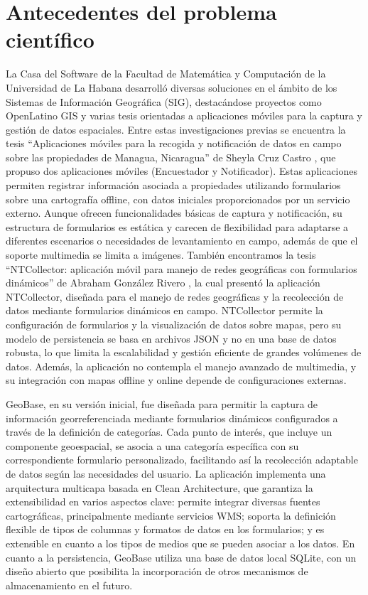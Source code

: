 \documentclass[12pt, a4paper]{book}
\begin{document}
\section{Antecedentes del problema
científico}\label{antecedentes-del-problema-cientuxedfico}
La Casa del Software de la Facultad de Matemática y Computación de la Universidad de La Habana desarrolló diversas soluciones en el ámbito de los Sistemas de Información Geográfica (SIG), destacándose proyectos como OpenLatino GIS y varias tesis orientadas a aplicaciones móviles para la captura y gestión de datos espaciales. Entre estas investigaciones previas se encuentra la tesis ``Aplicaciones móviles  para la recogida y notificación de datos en campo sobre las propiedades de Managua, Nicaragua'' de Sheyla Cruz Castro \cite{castro2018}, que propuso dos aplicaciones móviles (Encuestador y Notificador). Estas aplicaciones permiten registrar información asociada a propiedades utilizando formularios sobre una cartografía offline, con datos iniciales proporcionados por un servicio externo. Aunque ofrecen funcionalidades básicas de captura y notificación, su estructura de formularios es estática y carecen de flexibilidad para adaptarse a diferentes escenarios o necesidades de levantamiento en campo, además de que el soporte multimedia se limita a imágenes. También encontramos la tesis ``NTCollector: aplicación móvil para manejo de redes geográficas con formularios dinámicos'' de Abraham González Rivero \cite{rivero2019}, la cual presentó la aplicación NTCollector, diseñada para el manejo de redes geográficas y la recolección de datos mediante formularios dinámicos en campo. NTCollector permite la configuración de formularios y la visualización de datos sobre mapas, pero su modelo de persistencia se basa en archivos JSON y no en una base de datos robusta, lo que limita la escalabilidad y gestión eficiente de grandes volúmenes de datos. Además, la aplicación no contempla el manejo avanzado de multimedia, y su integración con mapas offline y online depende de configuraciones externas.

GeoBase, en su versión inicial, fue diseñada para permitir la captura de información georreferenciada mediante formularios dinámicos configurados a través de la definición de categorías. Cada punto de interés, que incluye un componente geoespacial, se asocia a una categoría específica con su correspondiente formulario personalizado, facilitando así la recolección adaptable de datos según las necesidades del usuario. La aplicación implementa una arquitectura multicapa basada en Clean Architecture, que garantiza la extensibilidad en varios aspectos clave: permite integrar diversas fuentes cartográficas, principalmente mediante servicios WMS; soporta la definición flexible de tipos de columnas y formatos de datos en los formularios; y es extensible en cuanto a los tipos de medios que se pueden asociar a los datos. En cuanto a la persistencia, GeoBase utiliza una base de datos local SQLite, con un diseño abierto que posibilita la incorporación de otros mecanismos de almacenamiento en el futuro.
\end{document}
